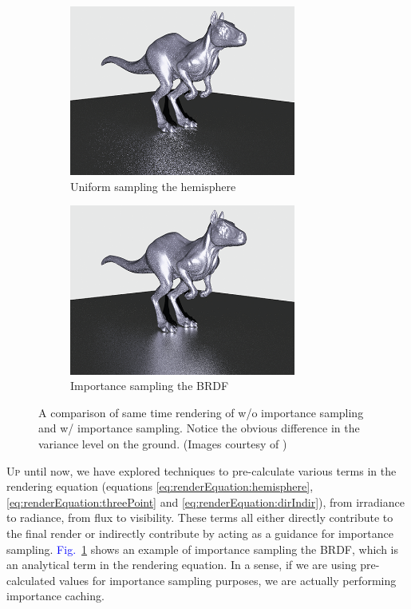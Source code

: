 \documentclass[]{book}
\renewcommand{\figurename}{\textcolor{blue}{Fig.\ }}
\begin{document}
\begin{figure}[!ht]
	\begin{subfigure}{0.5\textwidth}
		\centering
		\includegraphics[height=2.2in]{img/IMP_0-1.png}
		\caption{Uniform sampling the hemisphere}
	\end{subfigure}%
	\begin{subfigure}{0.5\textwidth}
		\centering
		\includegraphics[height=2.2in]{img/IMP_0-2.png}
		\caption{Importance sampling the BRDF}
	\end{subfigure}
	\caption[Importance of Importance Sampling]{A comparison of same time rendering of w/o importance sampling and w/ importance sampling. Notice the obvious difference in the variance level on the ground. (Images courtesy of \citeauthor{PBRT3e})}
	\label{fig:IMP:importance}
\end{figure}
\lettrine{U}{p} until now, we have explored techniques to pre-calculate various terms in the rendering equation (equations \ref{eq:renderEquation:hemisphere}, \ref{eq:renderEquation:threePoint} and \ref{eq:renderEquation:dirIndir}), from irradiance to radiance, from flux to visibility.
These terms all either directly contribute to the final render or indirectly contribute by acting as a guidance for importance sampling.
\figurename \ref{fig:IMP:importance} shows an example of importance sampling the BRDF, which is an analytical term in the rendering equation.
In a sense, if we are using pre-calculated values for importance sampling purposes, we are actually performing importance caching.
\end{document}
